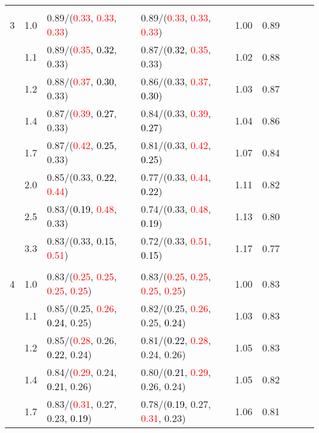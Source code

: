 \documentclass[10pt,a4paper]{report}
\begin{document}
\begin{table}[!htbp]
\begin{center}
{\begin{tabular}{ccllccccc}
			&&&&\\
			3			&1.0&0.89/(\textcolor{red}{0.33}, \textcolor{red}{0.33}, \textcolor{red}{0.33})&0.89/(\textcolor{red}{0.33}, \textcolor{red}{0.33}, \textcolor{red}{0.33})&1.00&0.89\\
			&1.1&0.89/(\textcolor{red}{0.35}, \textcolor{black}{0.32}, 0.33)&0.87/(\textcolor{black}{0.32}, \textcolor{red}{0.35}, 0.33)&1.02&0.88\\
			&1.2&0.88/(\textcolor{red}{0.37}, \textcolor{black}{0.30}, 0.33)&0.86/(0.33, \textcolor{red}{0.37}, \textcolor{black}{0.30})&1.03&0.87\\
			&1.4&0.87/(\textcolor{red}{0.39}, \textcolor{black}{0.27}, 0.33)&0.84/(0.33, \textcolor{red}{0.39}, \textcolor{black}{0.27})&1.04&0.86\\
			&1.7&0.87/(\textcolor{red}{0.42}, \textcolor{black}{0.25}, 0.33)&0.81/(0.33, \textcolor{red}{0.42}, \textcolor{black}{0.25})&1.07&0.84\\
			&2.0&0.85/(0.33, \textcolor{black}{0.22}, \textcolor{red}{0.44})&0.77/(0.33, \textcolor{red}{0.44}, \textcolor{black}{0.22})&1.11&0.82\\
			&2.5&0.83/(\textcolor{black}{0.19}, \textcolor{red}{0.48}, 0.33)&0.74/(0.33, \textcolor{red}{0.48}, \textcolor{black}{0.19})&1.13&0.80\\
			&3.3&0.83/(0.33, \textcolor{black}{0.15}, \textcolor{red}{0.51})&0.72/(0.33, \textcolor{red}{0.51}, \textcolor{black}{0.15})&1.17&0.77\\
			&&&&\\
			4			&1.0&0.83/(\textcolor{red}{0.25}, \textcolor{red}{0.25}, \textcolor{red}{0.25}, \textcolor{red}{0.25})&0.83/(\textcolor{red}{0.25}, \textcolor{red}{0.25}, \textcolor{red}{0.25}, \textcolor{red}{0.25})&1.00&0.83\\
			&1.1&0.85/(0.25, \textcolor{red}{0.26}, \textcolor{black}{0.24}, 0.25)&0.82/(0.25, \textcolor{red}{0.26}, 0.25, \textcolor{black}{0.24})&1.03&0.83\\
			&1.2&0.85/(\textcolor{red}{0.28}, 0.26, \textcolor{black}{0.22}, 0.24)&0.81/(\textcolor{black}{0.22}, \textcolor{red}{0.28}, 0.24, 0.26)&1.05&0.83\\
			&1.4&0.84/(\textcolor{red}{0.29}, 0.24, \textcolor{black}{0.21}, 0.26)&0.80/(\textcolor{black}{0.21}, \textcolor{red}{0.29}, 0.26, 0.24)&1.05&0.82\\
			&1.7&0.83/(\textcolor{red}{0.31}, 0.27, 0.23, \textcolor{black}{0.19})&0.78/(\textcolor{black}{0.19}, 0.27, \textcolor{red}{0.31}, 0.23)&1.06&0.81\\

\end{tabular}}
\end{center}
\end{table}
\end{document}
